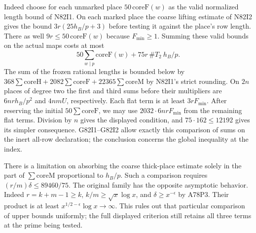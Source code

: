 Indeed choose for each unmarked place $50\,\mathrm{coreF}(w)$
as the valid normalized length bound of N82I1. On each marked
place the coarse lifting estimate of N82I2 gives the bound
$3r(25h_B/p+3)$ before testing it against the place's row
length. There as well $9r\le50\,\mathrm{coreF}(w)$ because
$F_{\min}\ge1$. Summing these valid bounds on the actual
maps costs at most
\[
 50\sum_{w\mid p}\mathrm{coreF}(w)
                  +75r\,\#T_2\ h_B/p.
\]
The sum of the frozen rational lengths is bounded below by
$368\sum\mathrm{coreH}+2082\sum\mathrm{coreF}
+22365\sum\mathrm{coreM}$ by N82I1's strict rounding.
On $2n$ places of degree two the first and third sums before
their multipliers are $6nrh_B/p^2$ and $4nmU$, respectively.
Each flat term is at least $3r F_{\min}$. After reserving
the initial $50\sum\mathrm{coreF}$, we may use
$2032\cdot6nr F_{\min}$ from the remaining flat terms.
Division by $n$ gives the displayed condition, and
$75\cdot162\le12192$ gives its simpler consequence.
G82I1--G82I2 allow exactly this comparison of sums on the
inert all-row declaration; the conclusion concerns the global
inequality at the index.

There is a limitation on absorbing the coarse thick-place
estimate solely in the part of $\sum\mathrm{coreM}$ proportional
to $h_B/p$. Such a comparison requires
$(r/m)\delta\le 89460/75$. The original family has the opposite
asymptotic behavior. Indeed $r=k+m-1\ge k$,
$k/m\ge\sqrt{x}\log x$, and $\delta\ge x^{-\epsilon}$ by A78P3.
Their product is at least $x^{1/2-\epsilon}\log x\to\infty$.
This rules out that particular comparison of upper bounds
uniformly; the full displayed criterion still retains all three
terms at the prime being tested.
